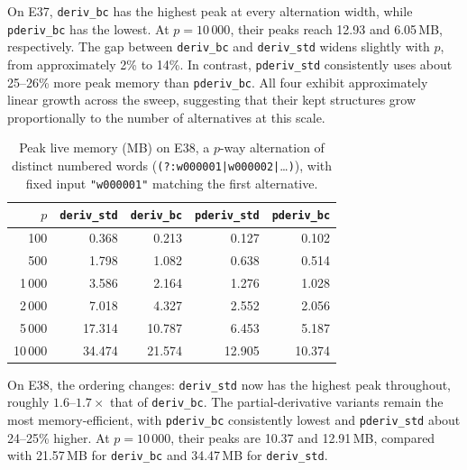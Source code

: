 On E37, \texttt{deriv\_bc} has the highest
peak at every alternation width,
while \texttt{pderiv\_bc} has the lowest.
At $p=10\,000$, their peaks reach
12.93 and 6.05\,MB, respectively.
The gap between \texttt{deriv\_bc} and
\texttt{deriv\_std} widens slightly with $p$,
from approximately 2\% to 14\%.
In contrast, \texttt{pderiv\_std}
consistently uses about 25--26\% more
peak memory than \texttt{pderiv\_bc}.
All four exhibit approximately linear
growth across the sweep, suggesting that
their kept structures grow proportionally
to the number of alternatives at this scale.

\begin{table}[H]
\centering
\small
\setlength{\tabcolsep}{4pt}
\begin{tabular*}{\textwidth}{@{\extracolsep{\fill}} r rrrr}
\hline
$p$ & \texttt{deriv\_std} & \texttt{deriv\_bc} & \texttt{pderiv\_std} & \texttt{pderiv\_bc} \\
\hline
100     &  0.368 &  0.213 &  0.127 &  0.102 \\
500     &  1.798 &  1.082 &  0.638 &  0.514 \\
1\,000  &  3.586 &  2.164 &  1.276 &  1.028 \\
2\,000  &  7.018 &  4.327 &  2.552 &  2.056 \\
5\,000  & 17.314 & 10.787 &  6.453 &  5.187 \\
10\,000 & 34.474 & 21.574 & 12.905 & 10.374 \\
\hline
\end{tabular*}
\caption{Peak live memory (MB) on E38, a $p$-way
alternation of distinct numbered words
(\texttt{(?:w000001|w000002|}\dots\texttt{)}),
with fixed input \texttt{"w000001"} matching
the first alternative.}
\label{tab:patho-mem-e38}
\end{table}


On E38, the ordering changes:
\texttt{deriv\_std} now has the highest
peak throughout, roughly $1.6$--$1.7\times$
that of \texttt{deriv\_bc}.
The partial-derivative variants remain
the most memory-efficient, with
\texttt{pderiv\_bc} consistently lowest
and \texttt{pderiv\_std} about 24--25\% higher.
At $p=10\,000$, their peaks are
10.37 and 12.91\,MB, compared with
21.57\,MB for \texttt{deriv\_bc}
and 34.47\,MB for \texttt{deriv\_std}.

